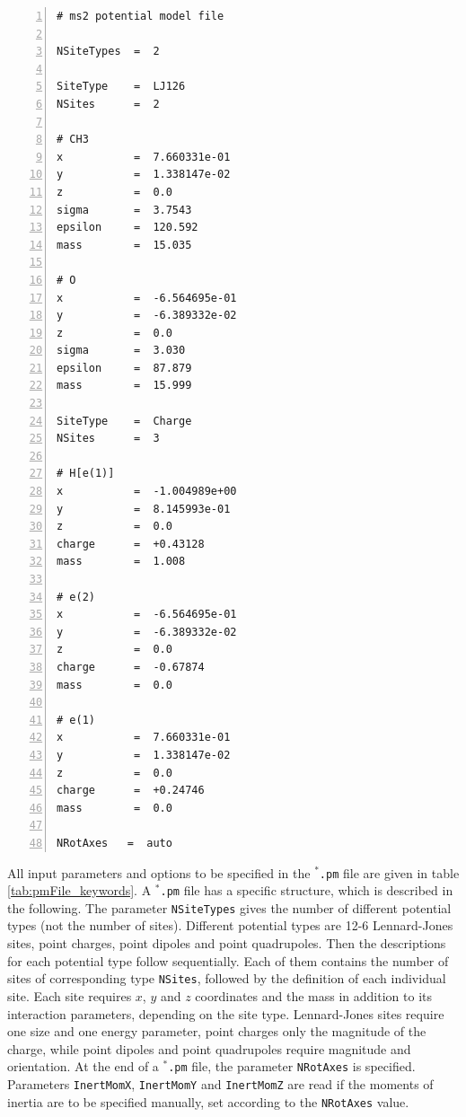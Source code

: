 \vspace{0.7cm}
\begin{Verbatim}[frame=single,framesep=6.5mm,label=\fbox{*.pm file for methanol},numbers=left,numbersep=-10pt,xrightmargin=5cm]
# ms2 potential model file 

NSiteTypes  =  2

SiteType    =  LJ126
NSites      =  2

# CH3
x           =  7.660331e-01
y           =  1.338147e-02
z           =  0.0
sigma       =  3.7543
epsilon     =  120.592
mass        =  15.035

# O
x           =  -6.564695e-01
y           =  -6.389332e-02
z           =  0.0
sigma       =  3.030
epsilon     =  87.879
mass        =  15.999

SiteType    =  Charge
NSites      =  3

# H[e(1)]
x           =  -1.004989e+00
y           =  8.145993e-01
z           =  0.0
charge      =  +0.43128
mass        =  1.008

# e(2)
x           =  -6.564695e-01
y           =  -6.389332e-02
z           =  0.0
charge      =  -0.67874
mass        =  0.0

# e(1)
x           =  7.660331e-01
y           =  1.338147e-02
z           =  0.0
charge      =  +0.24746
mass        =  0.0

NRotAxes   =  auto
\end{Verbatim}
\vspace{0.7cm}


All input parameters and options to be specified in the \texttt{$^{*}$\hspace{-3pt}.pm} file are given in table \ref{tab:pmFile_keywords}. A \texttt{$^{*}$\hspace{-3pt}.pm} file has a specific structure, which is described in the following. The parameter \texttt{NSiteTypes} gives the number of different potential types (not the number of sites). Different potential types are 12-6 Lennard-Jones sites, point charges, point dipoles and point quadrupoles. Then the descriptions for each potential type follow sequentially. Each of them contains the number of sites of corresponding type \texttt{NSites}, followed by the definition of each individual site. Each site requires $x$, $y$ and $z$ coordinates and the mass in addition to its interaction parameters, depending on the site type. Lennard-Jones sites require one size and one energy parameter, point charges only the magnitude of the charge, while point dipoles and point quadrupoles require magnitude and orientation. At the end of a \texttt{$^{*}$\hspace{-3pt}.pm} file, the parameter \texttt{NRotAxes} is specified. Parameters \texttt{InertMomX}, \texttt{InertMomY} and \texttt{InertMomZ} are read if the moments of inertia are to be specified manually, set according to the \texttt{NRotAxes} value.



